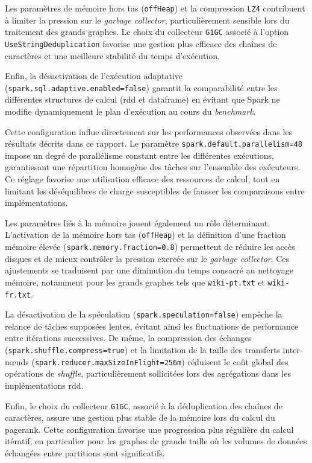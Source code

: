 \documentclass[conference]{IEEEtran}
\begin{document}
Les paramètres de mémoire hors tas (\texttt{offHeap}) et la compression \texttt{LZ4} contribuent à limiter la pression sur le \textit{garbage collector}, particulièrement sensible lors du traitement des grands graphes.  
Le choix du collecteur \texttt{G1GC} associé à l'option \texttt{UseStringDeduplication} favorise une gestion plus efficace des chaînes de caractères et une meilleure stabilité du temps d'exécution.

Enfin, la désactivation de l'exécution adaptative (\texttt{spark.sql.adaptive.enabled=false}) garantit la comparabilité entre les différentes structures de calcul (\gls{rdd} et \gls{dataframe}) en évitant que Spark ne modifie dynamiquement le plan d'exécution au cours du \textit{benchmark}.

Cette configuration influe directement sur les performances observées dans les résultats décrits dans ce rapport.
Le paramètre \texttt{spark.default.parallelism=48} impose un degré de parallélisme constant entre les différentes exécutions, garantissant une répartition homogène des tâches sur l'ensemble des exécuteurs.  
Ce réglage favorise une utilisation efficace des ressources de calcul, tout en limitant les déséquilibres de charge susceptibles de fausser les comparaisons entre implémentations.

Les paramètres liés à la mémoire jouent également un rôle déterminant.  
L'activation de la mémoire hors tas (\texttt{offHeap}) et la définition d'une fraction mémoire élevée (\texttt{spark.memory.fraction=0.8}) permettent de réduire les accès disques et de mieux contrôler la pression exercée sur le \textit{garbage collector}.  
Ces ajustements se traduisent par une diminution du temps consacré au nettoyage mémoire, notamment pour les grands graphes tels que \texttt{wiki-pt.txt} et \texttt{wiki-fr.txt}.

La désactivation de la spéculation (\texttt{spark.speculation=false}) empêche la relance de tâches supposées lentes, évitant ainsi les fluctuations de performance entre itérations successives.  
De même, la compression des échanges (\texttt{spark.shuffle.compress=true}) et la limitation de la taille des transferts inter-nœuds (\texttt{spark.reducer.maxSizeInFlight=256m}) réduisent le coût global des opérations de \textit{shuffle}, particulièrement sollicitées lors des agrégations dans les implémentations \gls{rdd}.

Enfin, le choix du collecteur \texttt{G1GC}, associé à la déduplication des chaînes de caractères, assure une gestion plus stable de la mémoire lors du calcul du \gls{pagerank}.  
Cette configuration favorise une progression plus régulière du calcul itératif, en particulier pour les graphes de grande taille où les volumes de données échangées entre partitions sont significatifs.
\end{document}
